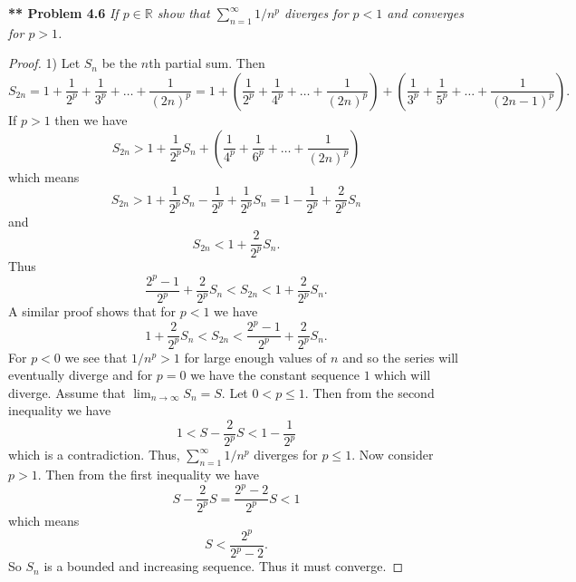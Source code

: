 \documentclass{article}
\begin{document}
\begin{flushleft}
\textbf{** Problem 4.6}
\textit{If $p \in \mathbb{R}$ show that $\sum_{n=1}^{\infty} 1/n^p$ diverges for $p < 1$ and converges for $p > 1$.}
\begin{proof}
1) Let $S_n$ be the $n$th partial sum. Then
\[
S_{2n} = 1 + \frac{1}{2^p} + \frac{1}{3^p} + \dots + \frac{1}{(2n)^p} = 1 + \left ( \frac{1}{2^p} + \frac{1}{4^p} + \dots + \frac{1}{(2n)^p} \right ) + \left ( \frac{1}{3^p} + \frac{1}{5^p} + \dots + \frac{1}{(2n-1)^p} \right ).
\]
If $p > 1$ then we have
\[
S_{2n} > 1 + \frac{1}{2^p} S_n + \left ( \frac{1}{4^p} + \frac{1}{6^p} + \dots + \frac{1}{(2n)^p} \right )
\]
which means
\[
S_{2n} > 1 + \frac{1}{2^p} S_n - \frac{1}{2^p} + \frac{1}{2^p} S_n = 1 - \frac{1}{2^p} + \frac{2}{2^p} S_n
\]
and
\[
S_{2n} < 1 + \frac{2}{2^p}S_n.
\]
Thus
\[
\frac{2^p-1}{2^p} + \frac{2}{2^p}S_n < S_{2n} < 1 + \frac{2}{2^p}S_n.
\]
A similar proof shows that for $p < 1$ we have
\[
1 + \frac{2}{2^p}S_n < S_{2n} < \frac{2^p-1}{2^p} + \frac{2}{2^p} S_n.
\]
For $p < 0$ we see that $1/n^p > 1$ for large enough values of $n$ and so the series will eventually diverge and for $p = 0$ we have the constant sequence $1$ which will diverge. Assume that $\lim_{n \rightarrow \infty} S_n = S$. Let $0 < p \leq 1$. Then from the second inequality we have
\[
1 < S - \frac{2}{2^p}S < 1 - \frac{1}{2^p}
\]
which is a contradiction. Thus, $\sum_{n=1}^{\infty} 1/n^p$ diverges for $p \leq 1$. Now consider $p > 1$. Then from the first inequality we have
\[
S - \frac{2}{2^p}S = \frac{2^p-2}{2^p} S < 1
\]
which means
\[
S < \frac{2^p}{2^p-2}.
\]
So $S_n$ is a bounded and increasing sequence. Thus it must converge.
\end{proof}


\end{flushleft}
\end{document}
